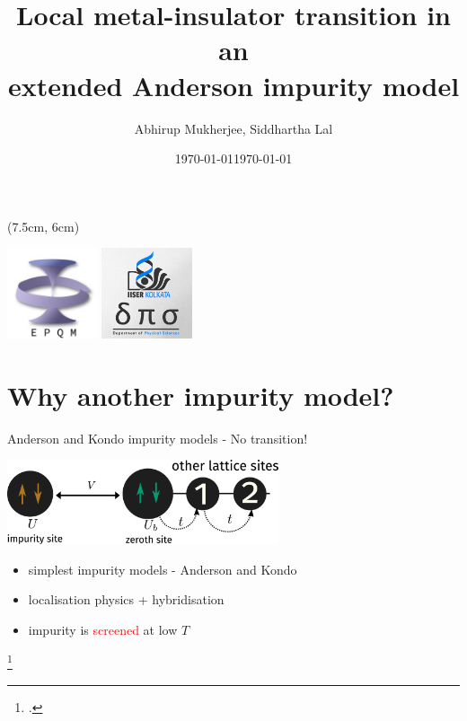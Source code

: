 \documentclass[11pt,aspectratio=169]{beamer}
\title{
{Local metal-insulator transition in an\\ extended Anderson impurity model}
}
\date{\today}
\author{Abhirup Mukherjee, Siddhartha Lal}
\institute{Department of Physical Sciences, IISER Kolkata, Mohanpur}
\date{\today}
\newcommand{\focus}[1]{\textcolor{red}{#1}}
\begin{document}
\centering

\begin{frame}
\maketitle
\begin{textblock*}{0.7\textwidth}(7.5cm, 6cm)
	\centering
	\vspace*{\fill}

	\hspace*{\fill}
	\includegraphics[width=0.2\textwidth]{figures/epqm_logo_mod.jpeg}
	\includegraphics[width=0.2\textwidth]{figures/dps_logo.jpeg}
	\hspace*{\fill}

	\vspace*{\fill}
\end{textblock*}
\end{frame}

\section{Why another impurity model?}

\begin{frame}{Anderson and Kondo impurity models - No transition!}

\includegraphics[width=0.6\textwidth]{figures/siam.pdf}

\vspace*{\fill}

\begin{itemize}
	\item simplest impurity models - Anderson and Kondo \\[10pt]
	\item localisation physics + hybridisation\\[10pt]
	\item impurity is \focus{screened} at low \(T\)
\end{itemize}

\footcite{anderson_1961,anderson_1978,kondo1964resistance,wilson1975,hrk_wilson_1980,andreiKondoreview}

\end{frame}
\end{document}
